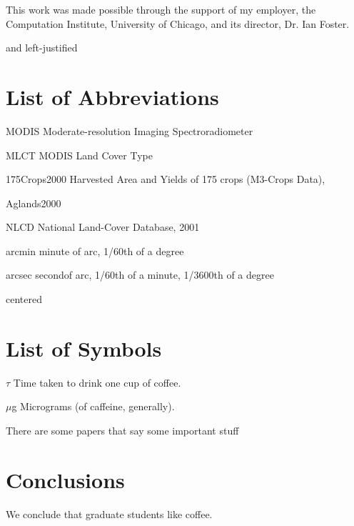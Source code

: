 \documentclass[draftthesis]{style/neiuthesis}
\begin{document}
This work was made possible through the support of my employer, the
Computation Institute, University of Chicago, and its director,
Dr. Ian Foster.


\tableofcontents \listoftables \listoffigures

and left-justified
\chapter{List of Abbreviations}

\begin{symbollist*}
\item[MODIS] Moderate-resolution Imaging Spectroradiometer
\item[MLCT] MODIS Land Cover Type \citep{MLCT}
\item[175Crops2000] Harvested Area and Yields of 175 crops (M3-Crops
Data), \citep{Monfreda2008}
\item[Aglands2000] \citep{Ramankutty2008}
\item [NLCD] National Land-Cover Database, 2001 \citep{Homer2004}
\item[arcmin] minute of arc, 1/60th of a degree
\item[arcsec] secondof arc, 1/60th of a minute, 1/3600th of a degree

\end{symbollist*}

centered
\chapter{List of Symbols}

\begin{symbollist}[0.7in]
\item[$\tau$] Time taken to drink one cup of coffee.
\item[$\mu$g] Micrograms (of caffeine, generally).
\end{symbollist}

\mainmatter

There are some papers that say some important stuff
\citep{Ramankutty2008}





\chapter{Conclusions}

We conclude that graduate students like coffee.

\appendix*

%

\backmatter


\end{document}
